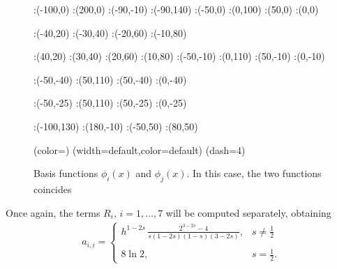\begin{figure}[h]
\figinit{0.8pt}
:(-100,0) :(200,0)
:(-90,-10) :(-90,140)
:(-50,0) :(0,100) 
:(50,0) :(0,0)

:(-40,20) :(-30,40) 
:(-20,60) :(-10,80)

:(40,20) :(30,40) 
:(20,60) :(10,80)
%
:(-50,-10) :(0,110) 
:(50,-10) :(0,-10)

:(-50,-40) :(50,110) 
:(50,-40) :(0,-40)

:(-50,-25) :(50,110) 
:(50,-25) :(0,-25)

:(-100,130) :(180,-10)
:(-50,50) :(80,50)

\figdrawbegin{}
\figdrawarrow[1,2]
\figset (color=\Redrgb)
\figdrawline[3,4]
\figdrawline[4,5]
\figset (width=default,color=default)
\figset(dash=4)
\figdrawline[4,6]
\figdrawline[41,61]
\figdrawarrow[11,12]

\figdrawend

\centerline{\box\figBoxA}
\caption{Basis functions $\phi_i(x)$ and $\phi_j(x)$. In this case, the two functions coincides}\label{basis_dia}
\end{figure}

Once again, the terms $R_i$, $i=1,\ldots,7$ will be computed separately, obtaining
\begin{align*}
	a_{i,i} = \begin{cases}
			\displaystyle h^{1-2s}\,\frac{2^{3-2s}-4}{s(1-2s)(1-s)(3-2s)}, & \displaystyle s\neq\frac{1}{2}
			\\
			\\
			8\ln 2, & \displaystyle s=\frac{1}{2}.			
			\end{cases}	
\end{align*}

